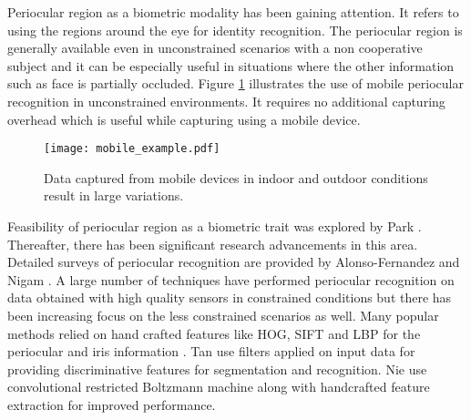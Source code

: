 \documentclass[10pt,twocolumn,letterpaper]{article}
\begin{document}
Periocular region as a biometric modality \cite{bharadwaj2010periocular,park2009periocular} has been gaining attention. It refers to using the regions around the eye for identity recognition. The periocular region is generally available even in unconstrained scenarios with a non cooperative subject and it can be especially useful in situations where the other information such as face is partially occluded. Figure \ref{fig:mobile_eg} illustrates the use of mobile periocular recognition in unconstrained environments. It requires no additional capturing overhead which is useful while capturing using a mobile device. 
\begin{figure}
  \centering
  \texttt{[image: mobile\_example.pdf]}
  \caption{Data captured from mobile devices in indoor and outdoor conditions result in large variations.}
  \label{fig:mobile_eg}
\end{figure}
Feasibility of periocular region as a biometric trait was explored by Park \etal \cite{park2009periocular}. Thereafter, there has been significant research advancements in this area. Detailed surveys of periocular recognition are provided by Alonso-Fernandez \etal \cite{alonso2016survey} and Nigam \etal \cite{nigam2015ocular}. A large number of techniques have performed periocular recognition on data obtained with high quality sensors in constrained conditions but there has been increasing focus on the less constrained scenarios as well.
Many popular methods relied on hand crafted features like HOG, SIFT and LBP for the periocular and iris information \cite{bharadwaj2010periocular,nigam2015ocular}. %
Tan \etal \cite{tan2013towards} use filters applied on input data for providing discriminative features for segmentation and recognition. Nie \etal \cite{nie2014periocular} use convolutional restricted Boltzmann machine along with handcrafted feature extraction for improved performance.
\end{document}
